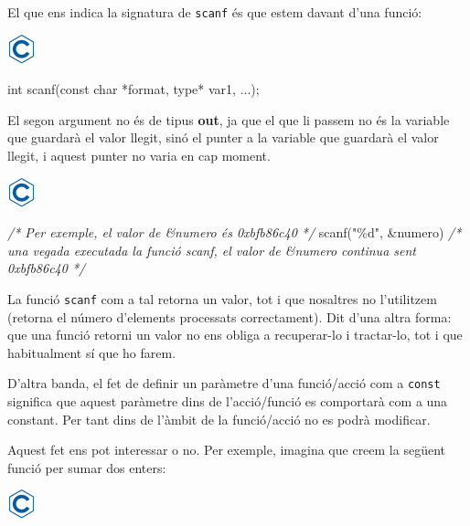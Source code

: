\documentclass[]{book}
\newenvironment{Shaded}{\begin{snugshade}}{\end{snugshade}}
\newcommand{\CommentTok}[1]{\textcolor[rgb]{0.56,0.35,0.01}{\textit{#1}}}
\newcommand{\DataTypeTok}[1]{\textcolor[rgb]{0.13,0.29,0.53}{#1}}
\newcommand{\NormalTok}[1]{#1}
\newcommand{\StringTok}[1]{\textcolor[rgb]{0.31,0.60,0.02}{#1}}
\begin{document}
El que ens indica la signatura de \texttt{scanf} és que estem davant d'una funció:

\includegraphics{./img/c.png}

\begin{Shaded}
\begin{Highlighting}[]
\DataTypeTok{int}\NormalTok{ scanf(}\DataTypeTok{const} \DataTypeTok{char}\NormalTok{ *format, type* var1, ...);}
\end{Highlighting}
\end{Shaded}

El segon argument no és de tipus \textbf{out}, ja que el que li passem no és la variable que guardarà el valor llegit, sinó el punter a la variable que guardarà el valor llegit, i aquest punter no varia en cap moment.

\includegraphics{./img/c.png}

\begin{Shaded}
\begin{Highlighting}[]
\CommentTok{/* Per exemple, el valor de \&numero és 0xbfb86c40 */}
\NormalTok{scanf(}\StringTok{"\%d"}\NormalTok{, \&numero)}
\CommentTok{/* una vegada executada la funció scanf, el valor de \&numero continua sent 0xbfb86c40 */}
\end{Highlighting}
\end{Shaded}

La funció \texttt{scanf} com a tal retorna un valor, tot i que nosaltres no l'utilitzem (retorna el número d'elements processats correctament). Dit d'una altra forma: que una funció retorni un valor no ens obliga a recuperar-lo i tractar-lo, tot i que habitualment sí que ho farem.

D'altra banda, el fet de definir un paràmetre d'una funció/acció com a \texttt{const} significa que aquest paràmetre dins de l'acció/funció es comportarà com a una constant. Per tant dins de l'àmbit de la funció/acció no es podrà modificar.

Aquest fet ens pot interessar o no. Per exemple, imagina que creem la següent funció per sumar dos enters:

\includegraphics{./img/c.png}
\end{document}

